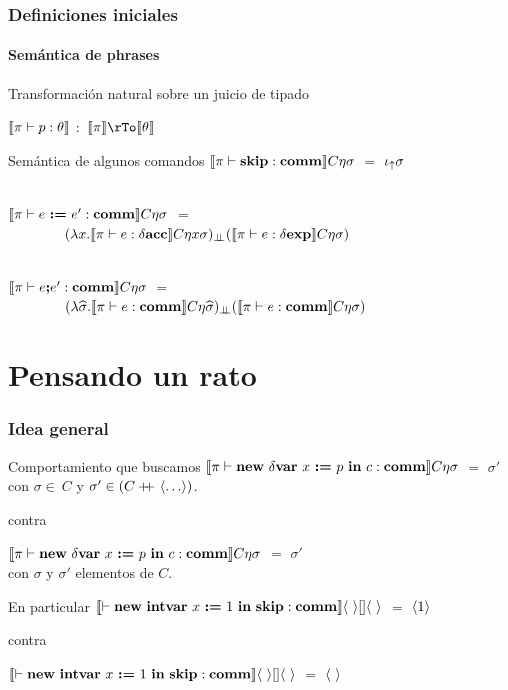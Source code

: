 \documentclass{beamer} %
\begin{document}
\begin{frame}
\frametitle{Definiciones iniciales}
\framesubtitle{Sem\'antica de phrases}

\begin{block}{Transformaci\'on natural sobre un juicio de tipado}

$\llbracket \pi \vdash p : \theta \rrbracket$ $:$ $\semBrcks{\pi} \rTo \semBrcks{\theta}$

\end{block}

\begin{block}{Sem\'antica de algunos comandos}\small
$\llbracket  \pi \vdash \textbf{skip} : \textbf{comm}  \rrbracket C\eta\sigma$ 
$=$ $\iota_{\uparrow} \sigma$\\
\
			
$\llbracket  \pi \vdash e \ \textbf{:=} \ e' : \textbf{comm}  \rrbracket C\eta\sigma$ 
$=$ \\
\ \ \ \ \ \ \ \ $(\lambda x . \llbracket \pi \vdash e : \delta \textbf{acc} \rrbracket C\eta x \sigma)_{\bot \!\!\! \bot}
(\llbracket  \pi \vdash e : \delta \textbf{exp}  \rrbracket C\eta\sigma)$\\
\

$\llbracket  \pi \vdash e \textbf{;} e' : \textbf{comm}  \rrbracket C\eta\sigma$ 
$=$ \\
\ \ \ \ \ \ \ \ $(\lambda \widehat{\sigma} . \llbracket \pi \vdash e : \textbf{comm} \rrbracket C\eta\widehat{\sigma})_{\bot \!\!\! \bot}
(\llbracket  \pi \vdash e : \textbf{comm} \rrbracket C\eta\sigma)$\\
\end{block}

\end{frame}

\section{Pensando un rato}

\begin{frame}
\frametitle{Idea general}

\begin{block}{Comportamiento que buscamos}
$\llbracket \pi \vdash \textbf{new} \ \delta \textbf{var} \ x \ \textbf{:=} \ p \ \textbf{in} \ c : \textbf{comm} \rrbracket C\eta\sigma$ $=$ $\sigma'$\\
con $\sigma \in \ C$ y $\sigma' \in (C +\kern-1.3ex+\kern0.8ex \langle  \ldots  \rangle)$.

contra

$\llbracket \pi \vdash \textbf{new} \ \delta \textbf{var} \ x \ \textbf{:=} \ p \ \textbf{in} \ c : \textbf{comm} \rrbracket C\eta\sigma$ $=$ $\sigma'$\\
con $\sigma$ y $\sigma'$ elementos de $C$.
\end{block}

\begin{block}{En particular}
$\semBrcks{ \vdash \newvar{\intvar}{x}{1}{\cskip} : \commt}\lrangles{\ }[]\lrangles{\ }$ $=$ $\langle 1 \rangle$

contra

$\semBrcks{ \vdash \newvar{\intvar}{x}{1}{\cskip} : \commt}\lrangles{\ }[]\lrangles{\ }$ $=$ $\langle \  \rangle$
\end{block}
\end{frame}
\end{document}

